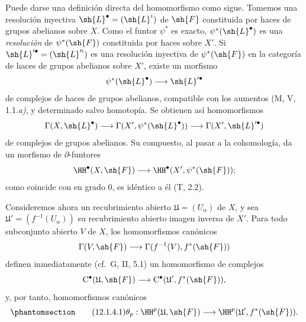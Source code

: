 \documentclass[oneside]{amsart}
\let\EGAOriginalLabel\label
\renewcommand{\label}[1]{\phantomsection\EGAOriginalLabel{#1}}
\begin{document}
\begin{env}[12.1.4]
\label{0.12.1.4}
Puede darse una definición directa del homomorfismo
 como sigue.
Tomemos una resolución inyectiva
$\sh{L}^\bullet=(\sh{L}^i)$ de $\sh{F}$ constituida por haces de
grupos abelianos sobre $X$.
Como el funtor $\psi^*$ es exacto,
$\psi^*(\sh{L}^\bullet)$ es una \emph{resolución} de $\psi^*(\sh{F})$
constituida por haces sobre $X'$.
Si $\sh{L}'^\bullet=(\sh{L}'^i)$ es una resolución inyectiva de
$\psi^*(\sh{F})$ en la categoría de haces de grupos abelianos sobre
$X'$, existe un morfismo
\[
  \psi^*(\sh{L}^\bullet)\longrightarrow\sh{L}'^\bullet
\]
de complejos de haces de grupos abelianos, compatible con los
aumentos (M, V, 1.1.\emph{a)}, y determinado salvo homotopía.
Se obtienen así homomorfismos
\[
  \Gamma(X,\sh{L}^\bullet)
  \longrightarrow
  \Gamma(X',\psi^*(\sh{L}^\bullet))
  \longrightarrow
  \Gamma(X',\sh{L}'^\bullet)
\]
de complejos de grupos abelianos.
Su compuesto, al pasar a la cohomología, da un morfismo de
$\partial$-funtores
\[
  \HH^\bullet(X,\sh{F})
  \longrightarrow
  \HH^\bullet(X',\psi^*(\sh{F}));
\]
como coincide con  en grado $0$, es idéntico a él
(T, 2.2).

Consideremos ahora un recubrimiento abierto
$\mathfrak{U}=(U_\alpha)$ de $X$, y sea
$\mathfrak{U}'=(f^{-1}(U_\alpha))$ su recubrimiento abierto imagen inversa
de $X'$.
Para todo subconjunto abierto $V$ de $X$, los homomorfismos canónicos
\[
  \Gamma(V,\sh{F})
  \longrightarrow
  \Gamma(f^{-1}(V),f^*(\sh{F}))
\]
definen inmediatamente (cf.\ G, II, 5.1) un homomorfismo de complejos
\[
  \mathrm{C}^\bullet(\mathfrak{U},\sh{F})
  \longrightarrow
  \mathrm{C}^\bullet(\mathfrak{U}',f^*(\sh{F})),
\]
y, por tanto, homomorfismos canónicos
\[
\label{0.12.1.4.1}
\tag{12.1.4.1}
  \theta_p:
  \HH^p(\mathfrak{U},\sh{F})
  \longrightarrow
  \HH^p(\mathfrak{U}',f^*(\sh{F})).
\]


\end{env}
\end{document}
